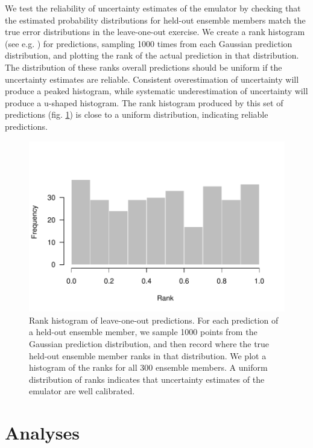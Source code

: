 \documentclass[gmd, manuscript]{copernicus}
\begin{document}
We test the reliability of uncertainty estimates of the emulator by checking that the estimated probability distributions for held-out ensemble members match the true error distributions in the leave-one-out exercise. We create a rank histogram (see e.g. \cite{hamill2001interpretation}) for predictions, sampling 1000 times from each Gaussian prediction distribution, and plotting the rank of the actual prediction in that distribution. The distribution of these ranks overall predictions should be uniform if the uncertainty estimates are reliable. Consistent overestimation of uncertainty will produce a peaked histogram, while systematic underestimation of uncertainty will produce a u-shaped histogram. The rank histogram produced by this set of predictions (fig. \ref{fig:rankhist}) is close to a uniform distribution, indicating reliable predictions.

\begin{figure}[t]
\includegraphics[width=12cm]{../graphics/rankhist.pdf}
\caption{Rank histogram of leave-one-out predictions. For each prediction of a held-out ensemble member, we sample 1000 points from the Gaussian prediction distribution, and then record where the true held-out ensemble member ranks in that distribution. We plot a histogram of the ranks for all 300 ensemble members. A uniform distribution of ranks indicates that uncertainty estimates of the emulator are well calibrated.
}
\label{fig:rankhist}
\end{figure}

\section{Analyses}\label{sec:analyses}
\end{document}
